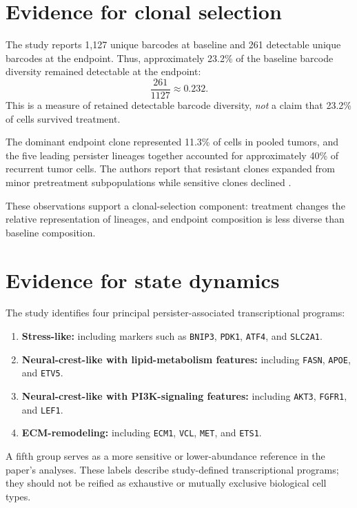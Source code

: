 \documentclass[11pt]{article}
\begin{document}
\section{Evidence for clonal selection}

The study reports 1,127 unique barcodes at baseline and 261 detectable unique barcodes at the endpoint. Thus, approximately 23.2\% of the baseline barcode diversity remained detectable at the endpoint:
\[
\frac{261}{1127} \approx 0.232.
\]
This is a measure of retained detectable barcode diversity, \emph{not} a claim that 23.2\% of cells survived treatment.

The dominant endpoint clone represented 11.3\% of cells in pooled tumors, and the five leading persister lineages together accounted for approximately 40\% of recurrent tumor cells. The authors report that resistant clones expanded from minor pretreatment subpopulations while sensitive clones declined \cite{Li2026}.

These observations support a clonal-selection component: treatment changes the relative representation of lineages, and endpoint composition is less diverse than baseline composition.

\section{Evidence for state dynamics}

The study identifies four principal persister-associated transcriptional programs:

\begin{enumerate}[leftmargin=2em]
  \item \textbf{Stress-like:} including markers such as \texttt{BNIP3}, \texttt{PDK1}, \texttt{ATF4}, and \texttt{SLC2A1}.
  \item \textbf{Neural-crest-like with lipid-metabolism features:} including \texttt{FASN}, \texttt{APOE}, and \texttt{ETV5}.
  \item \textbf{Neural-crest-like with PI3K-signaling features:} including \texttt{AKT3}, \texttt{FGFR1}, and \texttt{LEF1}.
  \item \textbf{ECM-remodeling:} including \texttt{ECM1}, \texttt{VCL}, \texttt{MET}, and \texttt{ETS1}.
\end{enumerate}

A fifth group serves as a more sensitive or lower-abundance reference in the paper's analyses. These labels describe study-defined transcriptional programs; they should not be reified as exhaustive or mutually exclusive biological cell types.
\end{document}
